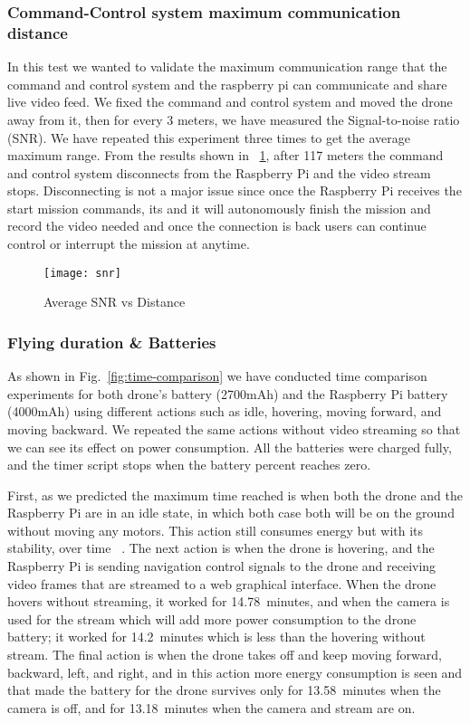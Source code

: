 \documentclass[../main.tex]{subfiles}
\begin{document}
\subsubsection{Command-Control system maximum communication distance}

In this test we wanted to validate the maximum communication range that
the command and control system and the raspberry pi can communicate
and share live video feed. We fixed the command and control system and moved
the drone away from it, then for every 3 meters, we have measured the Signal-to-noise ratio (SNR).
We have repeated this experiment three times to get the average maximum range.
From the results shown in ~\ref{fig:snr-vs-distance}, after 117 meters 
the command and control system disconnects from the Raspberry Pi
and the video stream stops. Disconnecting is not a major issue
since once the Raspberry Pi receives the start mission commands, its 
and it will autonomously finish the mission and record the video needed
and once the connection is back users can continue control or interrupt the mission
at anytime.
 
\begin{figure}[!t]
	\centering
	\texttt{[image: snr]}
	\caption{Average SNR vs Distance}
	\label{fig:snr-vs-distance}
\end{figure}

\subsubsection{Flying duration \& Batteries}

As shown in Fig.~\ref{fig:time-comparison} we have 
conducted time comparison experiments for both drone's
battery (2700mAh) and the Raspberry Pi battery (4000mAh) 
using different actions such as idle, hovering, 
moving forward, and moving backward. We repeated 
the same actions without video streaming so that 
we can see its effect on power consumption. 
All the batteries were charged fully, and the timer 
script stops when the battery percent reaches zero. 

First, as we predicted 
the maximum time reached is when both the drone and 
the Raspberry Pi are in an idle state, in which both case both will 
be on the ground without moving any motors.
This action still consumes energy but with 
its stability, over time ~\cite{Abey18}. 
The next action is when the drone is hovering, and 
the Raspberry Pi is sending navigation control 
signals to the drone and receiving video frames 
that are streamed to a web graphical interface. 
When the drone hovers without streaming, it worked 
for \SI{14.78}{minutes}, and when the camera is used for 
the stream which will add more power consumption to 
the drone battery; it worked for \SI{14.2}{minutes} which 
is less than the hovering without stream. The final 
action is when the drone takes off and keep moving 
forward, backward, left, and right, and in this action 
more energy consumption is seen and that made the 
battery for the drone survives only for \SI{13.58}{minutes}
when the camera is off, and for \SI{13.18}{minutes} 
when the camera and stream are on.
\end{document}
